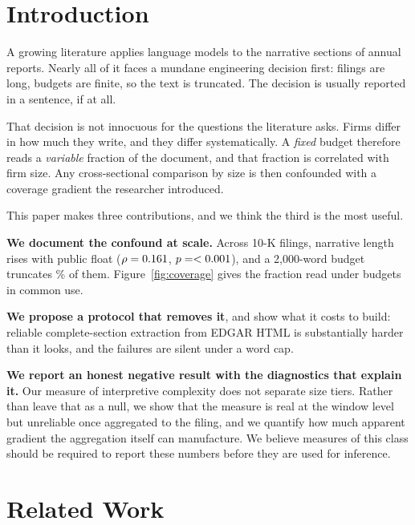 \documentclass[sigconf,nonacm]{acmart}
\begin{document}

\maketitle

\section{Introduction}

A growing literature applies language models to the narrative sections of annual
reports. Nearly all of it faces a mundane engineering decision first: filings are
long, budgets are finite, so the text is truncated. The decision is usually
reported in a sentence, if at all.

That decision is not innocuous for the questions the literature asks. Firms differ
in how much they write, and they differ systematically. A \emph{fixed} budget
therefore reads a \emph{variable} fraction of the document, and that fraction is
correlated with firm size. Any cross-sectional comparison by size is then
confounded with a coverage gradient the researcher introduced.

This paper makes three contributions, and we think the third is the most useful.

\textbf{We document the confound at scale.} Across \ScaleNUsable{} 10-K filings,
narrative length rises with public float ($\rho = 0.161$, $p = <0.001$), and
a 2,000-word budget truncates \ScaleTruncTwoK\% of them. Figure~\ref{fig:coverage}
gives the fraction read under budgets in common use.

\textbf{We propose a protocol that removes it}, and show what it costs to build:
reliable complete-section extraction from EDGAR HTML is substantially harder than
it looks, and the failures are silent under a word cap.

\textbf{We report an honest negative result with the diagnostics that explain
it.} Our measure of interpretive complexity does not separate size tiers. Rather
than leave that as a null, we show that the measure is real at the window level
but unreliable once aggregated to the filing, and we quantify how much apparent
gradient the aggregation itself can manufacture. We believe measures of this
class should be required to report these numbers before they are used for
inference.

\section{Related Work}
\end{document}
